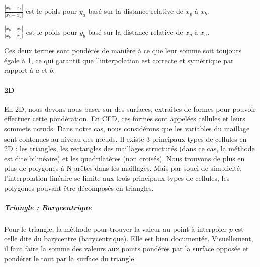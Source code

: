         \( \frac{|x_b - x_p|}{|x_b - x_a|} \) est le poids pour \( y_a \) basé sur la distance relative de \( x_p \) à \( x_b \).

        \( \frac{|x_p - x_a|}{|x_b - x_a|} \) est le poids pour \( y_b \) basé sur la distance relative de \( x_p \) à \( x_a \).\vspace{0.5cm}

Ces deux termes sont pondérés de manière à ce que leur somme soit toujours égale à 1, ce
qui garantit que l'interpolation est correcte et symétrique par rapport à \( a \) et \( b \).\vspace{0.5cm}

\vspace{-0.5cm}

\paragraph{2D}
\phantom{-}

En 2D, nous devons nous baser sur des surfaces, extraites de formes pour pouvoir effectuer cette pondération. En CFD, ces formes sont appelées cellules et leurs sommets nœuds. Dans notre cas, nous considérons que les variables du maillage sont contenues au niveau des nœuds. 
Il existe 3 principaux types de cellules en 2D : les triangles, les rectangles des maillages structurés (dans ce cas, la méthode est dite bilinéaire) et les quadrilatères (non croisés).
Nous trouvons de plus en plus de polygones à N arêtes dans les maillages. Mais par souci de simplicité, l'interpolation linéaire se limite aux trois principaux types de cellules, les polygones pouvant être décomposés en triangles. %

\subparagraph{Triangle : Barycentrique}

Pour le triangle, la méthode pour trouver la valeur au point à interpoler \( p \) est celle dite du barycentre (barycentrique).
Elle est bien documentée.
Visuellement, il faut faire la somme des valeurs aux points pondérés par la surface opposée et pondérer le tout par la surface du triangle.

